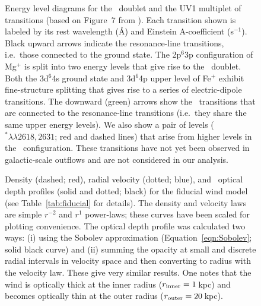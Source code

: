 \documentclass[12pt,preprint]{aastex}
\begin{document}
\begin{figure}
\caption{
Energy level diagrams for the \mgiid\ doublet and the UV1
multiplet of  transitions   
(based on Figure~7 from \cite{hmt+99}).
Each transition shown is
labeled by its rest wavelength (\AA) and Einstein A-coefficient
(s$^{-1}$). Black upward arrows
indicate the resonance-line transitions, i.e.\ those connected to the ground
state.  The 2p$^6$3p configuration of Mg$^+$ is split into
two energy levels that give rise to the \mgiid\ doublet.  
Both the 3d$^6$4s ground state and 3d$^6$4p upper level of Fe$^+$
exhibit fine-structure splitting that gives rise to a series of
electric-dipole transitions. 
The downward (green) arrows show the \feiis\ transitions that are connected to the
resonance-line transitions (i.e.\ they share the same upper energy
levels).  We also show a pair of levels ($^* \lambda\lambda
2618,2631$; red and dashed lines) that arise from higher levels in the \zconfig\
configuration.  These transitions have not yet been observed in
galactic-scale outflows and are not considered in our analysis.
}
\label{fig:energy}
\end{figure}

\begin{figure}
\caption{
Density (dashed; red), radial velocity (dotted; blue), and
\mgiia\ optical depth profiles (solid and dotted; black) for the fiducial
wind model (see Table~\ref{tab:fiducial} for details).
The density and velocity laws are simple $r^{-2}$ and $r^1$
power-laws; these curves have been scaled for plotting
convenience.  
The optical depth profile was calculated two ways: (i) using the
Sobolev approximation (Equation~\ref{eqn:Sobolev}; solid black curve)
and (ii) summing
the opacity at small and discrete radial intervals in velocity space
and then converting to radius with the velocity law.  These give
very similar results. One notes that
the wind is optically thick at the inner radius ($r_{\rm inner} =
1$\,kpc) and becomes optically thin at the outer radius ($r_{\rm
  outer} = 20$\,kpc).
}
\label{fig:fiducial_nvt}
\end{figure}
\end{document}
